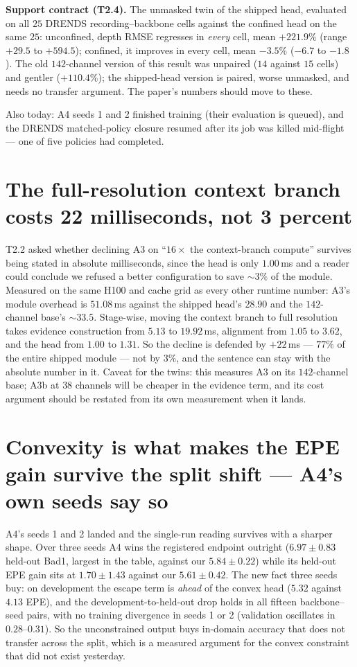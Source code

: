 \documentclass[11pt,a4paper]{article}
\begin{document}
\textbf{Support contract (T2.4).} The unmasked twin of the shipped head,
evaluated on all $25$ DRENDS recording--backbone cells against the confined
head on the same $25$: unconfined, depth RMSE regresses in \emph{every} cell,
mean $+221.9\%$ (range $+29.5$ to $+594.5$); confined, it improves in every
cell, mean $-3.5\%$ ($-6.7$ to $-1.8$). The old $142$-channel version of this
result was unpaired ($14$ against $15$ cells) and gentler ($+110.4\%$); the
shipped-head version is paired, worse unmasked, and needs no transfer
argument. The paper's numbers should move to these.

Also today: A4 seeds 1 and 2 finished training (their evaluation is queued),
and the DRENDS matched-policy closure resumed after its job was killed
mid-flight --- one of five policies had completed.



\section*{The full-resolution context branch costs 22 milliseconds, not 3 percent}

T2.2 asked whether declining A3 on ``$16\times$ the context-branch compute''
survives being stated in absolute milliseconds, since the head is only
$1.00$\,ms and a reader could conclude we refused a better configuration to
save ${\sim}3\%$ of the module. Measured on the same H100 and cache grid as
every other runtime number: A3's module overhead is $51.08$\,ms against the
shipped head's $28.90$ and the $142$-channel base's ${\sim}33.5$. Stage-wise,
moving the context branch to full resolution takes evidence construction from
$5.13$ to $19.92$\,ms, alignment from $1.05$ to $3.62$, and the head from
$1.00$ to $1.31$. So the decline is defended by $+22$\,ms --- $77\%$ of the
entire shipped module --- not by $3\%$, and the sentence can stay with the
absolute number in it. Caveat for the twins: this measures A3 on its
$142$-channel base; A3b at $38$ channels will be cheaper in the evidence term,
and its cost argument should be restated from its own measurement when it
lands.



\section*{Convexity is what makes the EPE gain survive the split shift --- A4's own seeds say so}

A4's seeds 1 and 2 landed and the single-run reading survives with a sharper
shape. Over three seeds A4 wins the registered endpoint outright
($6.97\pm0.83$ held-out Bad1, largest in the table, against our
$5.84\pm0.22$) while its held-out EPE gain sits at $1.70\pm1.43$ against our
$5.61\pm0.42$. The new fact three seeds buy: on development the escape term
is \emph{ahead} of the convex head ($5.32$ against $4.13$ EPE), and the
development-to-held-out drop holds in all fifteen backbone--seed pairs, with
no training divergence in seeds 1 or 2 (validation oscillates in
$0.28$--$0.31$). So the unconstrained output buys in-domain accuracy that
does not transfer across the split, which is a measured argument for the
convex constraint that did not exist yesterday.
\end{document}
